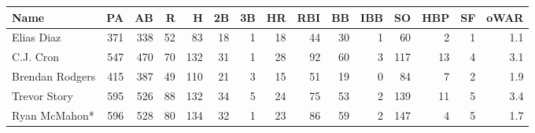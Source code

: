\documentclass[
  11pt,
]{book}
\theoremstyle{definition}
\theoremstyle{definition}
\theoremstyle{definition}
\theoremstyle{definition}
\theoremstyle{remark}
\begin{document}
\begin{table}[H]
\centering
\begin{tabular}{lrrrrrrrrrrrrrr}
\toprule
Name & PA & AB & R & H & 2B & 3B & HR & RBI & BB & IBB & SO & HBP & SF & oWAR\\
\midrule
Elias Diaz & 371 & 338 & 52 & 83 & 18 & 1 & 18 & 44 & 30 & 1 & 60 & 2 & 1 & 1.1\\
C.J. Cron & 547 & 470 & 70 & 132 & 31 & 1 & 28 & 92 & 60 & 3 & 117 & 13 & 4 & 3.1\\
Brendan Rodgers & 415 & 387 & 49 & 110 & 21 & 3 & 15 & 51 & 19 & 0 & 84 & 7 & 2 & 1.9\\
Trevor Story & 595 & 526 & 88 & 132 & 34 & 5 & 24 & 75 & 53 & 2 & 139 & 11 & 5 & 3.4\\
Ryan McMahon* & 596 & 528 & 80 & 134 & 32 & 1 & 23 & 86 & 59 & 2 & 147 & 4 & 5 & 1.7\\
\bottomrule
\end{tabular}
\end{table}
\end{document}

